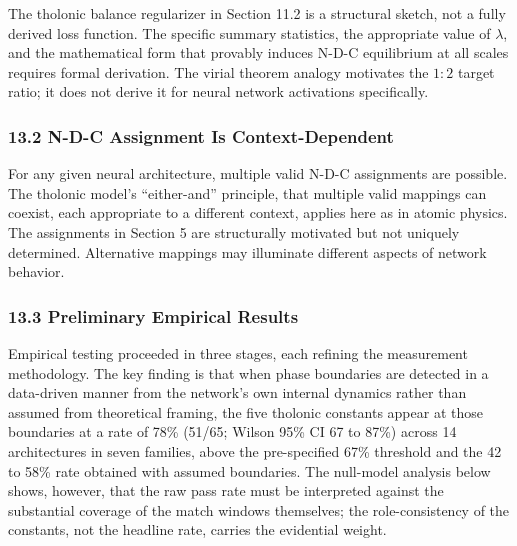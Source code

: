 \documentclass[
  11pt,
  letterpaper,
]{article}
\begin{document}
The tholonic balance regularizer in Section 11.2 is a structural sketch,
not a fully derived loss function. The specific summary statistics, the
appropriate value of \(\lambda\), and the mathematical form that
provably induces N-D-C equilibrium at all scales requires formal
derivation. The virial theorem analogy motivates the \(1:2\) target
ratio; it does not derive it for neural network activations
specifically.

\subsubsection{13.2 N-D-C Assignment Is
Context-Dependent}\label{n-d-c-assignment-is-context-dependent}

For any given neural architecture, multiple valid N-D-C assignments are
possible. The tholonic model's ``either-and'' principle, that multiple
valid mappings can coexist, each appropriate to a different context,
applies here as in atomic physics. The assignments in Section 5 are
structurally motivated but not uniquely determined. Alternative mappings
may illuminate different aspects of network behavior.

\subsubsection{13.3 Preliminary Empirical
Results}\label{preliminary-empirical-results}

Empirical testing proceeded in three stages, each refining the
measurement methodology. The key finding is that when phase boundaries
are detected in a data-driven manner from the network's own internal
dynamics rather than assumed from theoretical framing, the five tholonic
constants appear at those boundaries at a rate of 78\% (51/65; Wilson
95\% CI 67 to 87\%) across 14 architectures in seven families, above the
pre-specified 67\% threshold and the 42 to 58\% rate obtained with
assumed boundaries. The null-model analysis below shows, however, that
the raw pass rate must be interpreted against the substantial coverage
of the match windows themselves; the role-consistency of the constants,
not the headline rate, carries the evidential weight.
\end{document}
